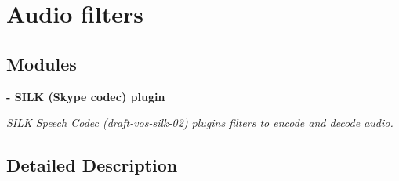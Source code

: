 \section{Audio filters}
\label{group__audiofilters}
\subsection*{Modules}
\begin{DoxyCompactItemize}
\item 
\textbf{ -\/ S\+I\+L\+K (\+Skype codec)  plugin}
\begin{DoxyCompactList}\small\item\em S\+I\+LK Speech Codec (draft-\/vos-\/silk-\/02) plugins filters to encode and decode audio. \end{DoxyCompactList}\end{DoxyCompactItemize}


\subsection{Detailed Description}

